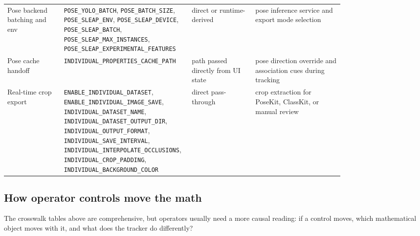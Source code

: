 \documentclass[11pt]{article}
\newcommand{\runtimekey}[1]{\texttt{#1}}
\begin{document}
\begin{longtable}{L{0.16\linewidth} L{0.21\linewidth} L{0.18\linewidth} L{0.25\linewidth}}
Pose backend batching and env & \runtimekey{POSE\_YOLO\_BATCH}, \runtimekey{POSE\_BATCH\_SIZE}, \runtimekey{POSE\_SLEAP\_ENV}, \runtimekey{POSE\_SLEAP\_DEVICE}, \runtimekey{POSE\_SLEAP\_BATCH}, \runtimekey{POSE\_SLEAP\_MAX\_INSTANCES}, \runtimekey{POSE\_SLEAP\_EXPERIMENTAL\_FEATURES} & direct or runtime-derived & pose inference service and export mode selection \\
Pose cache handoff & \runtimekey{INDIVIDUAL\_PROPERTIES\_CACHE\_PATH} & path passed directly from UI state & pose direction override and association cues during tracking \\
Real-time crop export & \runtimekey{ENABLE\_INDIVIDUAL\_DATASET}, \runtimekey{ENABLE\_INDIVIDUAL\_IMAGE\_SAVE}, \runtimekey{INDIVIDUAL\_DATASET\_NAME}, \runtimekey{INDIVIDUAL\_DATASET\_OUTPUT\_DIR}, \runtimekey{INDIVIDUAL\_OUTPUT\_FORMAT}, \runtimekey{INDIVIDUAL\_SAVE\_INTERVAL}, \runtimekey{INDIVIDUAL\_INTERPOLATE\_OCCLUSIONS}, \runtimekey{INDIVIDUAL\_CROP\_PADDING}, \runtimekey{INDIVIDUAL\_BACKGROUND\_COLOR} & direct pass-through & crop extraction for PoseKit, ClassKit, or manual review \\
\bottomrule
\end{longtable}

\subsection{How operator controls move the math}

The crosswalk tables above are comprehensive, but operators usually need a more causal reading: if a control moves, which mathematical object moves with it, and what does the tracker do differently?
\end{document}
